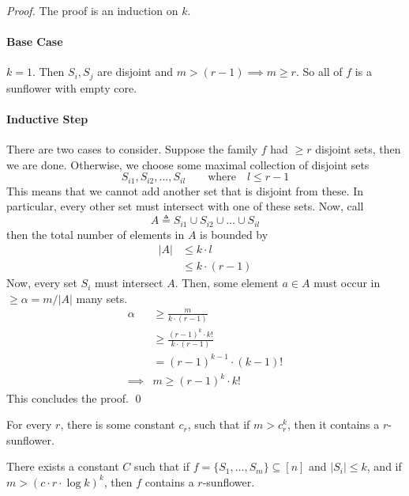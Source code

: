 \begin{proof}
	The proof is an induction on $k$. 
	\paragraph{Base Case} $k = 1$. Then $S_i, S_j$ are disjoint and $m > (r - 1) \implies m \geq r$. So all of $f$ is a sunflower with empty core.
	\paragraph{Inductive Step} There are two cases to consider. Suppose the family $f$ had $ \geq r$ disjoint sets, then we are done. Otherwise, we choose some maximal collection of disjoint sets
	\begin{equation}
		S_{i1}, S_{i2}, ..., S_{il} \quad \quad \text{where} \quad l \leq r - 1
	\end{equation}
	This means that we cannot add another set that is disjoint from these. In particular, every other set must intersect with one of these sets. Now, call 
	\begin{equation}
		A \triangleq S_{i1} \cup S_{i2} \cup \dots \cup S_{il}
	\end{equation} 
	then the total number of elements in $A$ is bounded by 
	\begin{align}
		|A| 
		&\leq k \cdot l  \\
		&\leq k \cdot (r - 1) 
	\end{align}
	Now, every set $S_i$ must intersect $A$. Then, some element $a \in A$ must occur in $ \geq \alpha = m / |A|$ many sets. 
	\begin{align}
		\alpha 
		&\geq \frac{m}{k\cdot(r - 1)} \\
		&\geq \frac{(r - 1)^k \cdot k!}{k \cdot (r - 1)} \\
		&= (r - 1)^{k - 1} \cdot (k - 1)! \\
		\implies &m \geq (r - 1)^k \cdot k!
	\end{align}
	This concludes the proof. \qed
\end{proof}

\begin{proposition}
	For every $r$, there is some constant $c_r$, such that if $m > c_r^k$, then it contains a $r$-sunflower. 
\end{proposition}

\begin{theorem}
	[ALWZ, 2020]
	There exists a constant $C$ such that if $f = \{ S_1, \dots, S_m \} \subseteq [n]$ and $|S_i| \leq k$, and if $m > (c \cdot r \cdot \log k ) ^k$, then $f$ contains a $r$-sunflower. 
\end{theorem}

